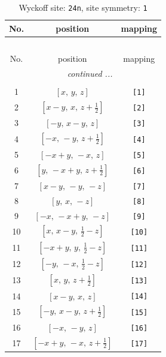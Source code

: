 \documentclass[fleqn,8pt]{jsarticle}
\begin{document}
\begin{longtable}{ccc}
\caption{Wyckoff site: {\tt 24n}, site symmetry: {\tt 1}}
 \\
 \hline \hline
No. & position & mapping \\ \hline \endfirsthead

\multicolumn{2}{l}{\tablename\ \thetable{}} \\
 \hline \hline
No. & position & mapping \\ \hline \endhead

 \hline \hline
\multicolumn{2}{r}{\footnotesize\it continued ...} \\ \endfoot

 \hline \hline
\multicolumn{2}{r}{} \\ \endlastfoot

1 & $\left[ x,\, y,\, z \right]$ & {\tt [1]} \\ \hline
2 & $\left[ x - y,\, x,\, z + \frac{1}{2} \right]$ & {\tt [2]} \\ \hline
3 & $\left[ - y,\, x - y,\, z \right]$ & {\tt [3]} \\ \hline
4 & $\left[ - x,\, - y,\, z + \frac{1}{2} \right]$ & {\tt [4]} \\ \hline
5 & $\left[ - x + y,\, - x,\, z \right]$ & {\tt [5]} \\ \hline
6 & $\left[ y,\, - x + y,\, z + \frac{1}{2} \right]$ & {\tt [6]} \\ \hline
7 & $\left[ x - y,\, - y,\, - z \right]$ & {\tt [7]} \\ \hline
8 & $\left[ y,\, x,\, - z \right]$ & {\tt [8]} \\ \hline
9 & $\left[ - x,\, - x + y,\, - z \right]$ & {\tt [9]} \\ \hline
10 & $\left[ x,\, x - y,\, \frac{1}{2} - z \right]$ & {\tt [10]} \\ \hline
11 & $\left[ - x + y,\, y,\, \frac{1}{2} - z \right]$ & {\tt [11]} \\ \hline
12 & $\left[ - y,\, - x,\, \frac{1}{2} - z \right]$ & {\tt [12]} \\ \hline
13 & $\left[ x,\, y,\, z + \frac{1}{2} \right]$ & {\tt [13]} \\ \hline
14 & $\left[ x - y,\, x,\, z \right]$ & {\tt [14]} \\ \hline
15 & $\left[ - y,\, x - y,\, z + \frac{1}{2} \right]$ & {\tt [15]} \\ \hline
16 & $\left[ - x,\, - y,\, z \right]$ & {\tt [16]} \\ \hline
17 & $\left[ - x + y,\, - x,\, z + \frac{1}{2} \right]$ & {\tt [17]} \\ \hline

\end{longtable}
\end{document}

